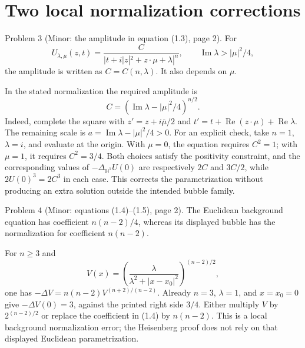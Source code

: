 \documentclass[10pt]{article}
\begin{document}
\section*{Two local normalization corrections}
Problem 3 (Minor: the amplitude in equation (1.3), page 2).  For \[U_{\lambda,\mu}(z,t)=
 \frac{C}{|t+i|z|^2+z\cdot\mu+\lambda|^n},\qquad
 \operatorname{Im}\lambda>|\mu|^2/4,\] the amplitude is written as \(C=C(n,\lambda)\). It also depends on \(\mu\).\par
In the stated normalization the required amplitude is \[C=(\operatorname{Im}\lambda-|\mu|^2/4)^{n/2}.\] Indeed, complete the square with \(z'=z+i\overline\mu/2\) and \(t'=t+\operatorname{Re}(z\cdot\mu)+\operatorname{Re}\lambda\). The remaining scale is \(a=\operatorname{Im}\lambda-|\mu|^2/4>0\). For an explicit check, take \(n=1\), \(\lambda=i\), and evaluate at the origin. With \(\mu=0\), the equation requires \(C^2=1\); with \(\mu=1\), it requires \(C^2=3/4\). Both choices satisfy the positivity constraint, and the corresponding values of \(-\Delta_{\mathbb H^1}U(0)\) are respectively \(2C\) and \(3C/2\), while \(2U(0)^3=2C^3\) in each case. This corrects the parametrization without producing an extra solution outside the intended bubble family.\par
Problem 4 (Minor: equations (1.4)–(1.5), page 2).  The Euclidean background equation has coefficient \(n(n-2)/4\), whereas its displayed bubble has the normalization for coefficient \(n(n-2)\).\par
For \(n\geq3\) and \[V(x)=\left(\frac{\lambda}{\lambda^2+|x-x_0|^2}\right)^{(n-2)/2},\] one has \(-\Delta V=n(n-2)V^{(n+2)/(n-2)}\). Already \(n=3\), \(\lambda=1\), and \(x=x_0=0\) give \(-\Delta V(0)=3\), against the printed right side \(3/4\). Either multiply \(V\) by \(2^{(n-2)/2}\) or replace the coefficient in (1.4) by \(n(n-2)\). This is a local background normalization error; the Heisenberg proof does not rely on that displayed Euclidean parametrization.\par
\end{document}
